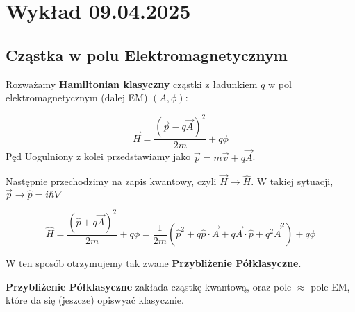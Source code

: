\section{Wykład 09.04.2025}

\subsection{Cząstka w polu Elektromagnetycznym}

Rozważamy \textbf{Hamiltonian klasyczny} cząstki z ładunkiem $q$ w pol elektromagnetycznym (dalej EM) $(A, \phi)$:

$$
\vec{H} = \frac{\left(\vec{p} - q\vec{A}\right)^2}{2m} + q\phi
$$
Pęd Uogulniony z kolei przedstawiamy jako $\vec{p} = m\vec{v} + q\vec{A}$.

Następnie przechodzimy na zapis kwantowy, czyli $\vec{H} \to \hat{H}$.
W takiej sytuacji, $\vec{p} \to \hat{p} = i \hbar \nabla$

$$
\hat{H} = \frac{\left (\hat{p} + q\vec{A}\right)^2}{2m} + q\phi = \frac{1}{2m}\left(\hat{p}^2 + q\hat{p}\cdot\vec{A} + q\vec{A}\cdot\hat{p} + q^2\vec{A}^2\right) + q\phi
$$

W ten sposób otrzymujemy tak zwane \textbf{Przybliżenie Półklasyczne}.

\begin{tcolorbox}
        \textbf{Przybliżenie Półklasyczne} zakłada cząstkę kwantową, oraz
        pole $\approx$ pole EM, które da się (jeszcze) opiswyać klasycznie.
\end{tcolorbox}



